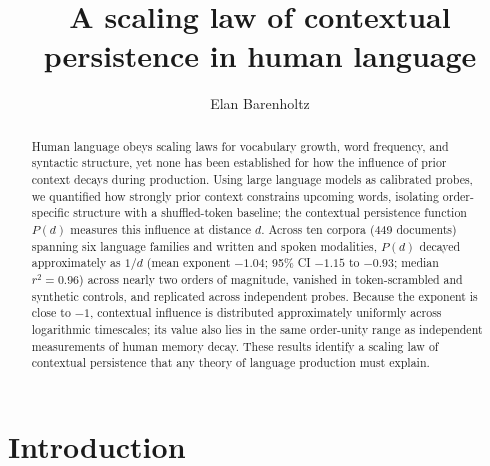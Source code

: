 \documentclass[11pt]{article}
\title{\bfseries A scaling law of contextual persistence in human language}
\author[1]{Elan Barenholtz}
\affil[1]{Department of Psychology and Center for Complex Systems, Florida Atlantic University}
\date{}
\begin{document}
\maketitle

\begin{abstract}
\noindent
Human language obeys scaling laws for vocabulary growth, word frequency, and syntactic
structure, yet none has been established for how the influence of prior context decays
during production. Using large language models as calibrated probes, we quantified how
strongly prior context constrains upcoming words, isolating order-specific structure with a
shuffled-token baseline; the contextual persistence function $P(d)$ measures this influence
at distance $d$. Across ten corpora (449 documents) spanning six language families and
written and spoken modalities, $P(d)$ decayed approximately as $1/d$ (mean exponent $-1.04$;
95\% CI $-1.15$ to $-0.93$; median $r^2=0.96$) across nearly two orders of magnitude, vanished
in token-scrambled and synthetic controls, and replicated across independent probes. Because
the exponent is close to $-1$, contextual influence is distributed approximately uniformly
across logarithmic timescales; its value also lies in the same order-unity range as independent
measurements of human memory decay. These results identify a scaling law of contextual persistence
that any theory of language production must explain.
\end{abstract}

\section{Introduction}
\end{document}
